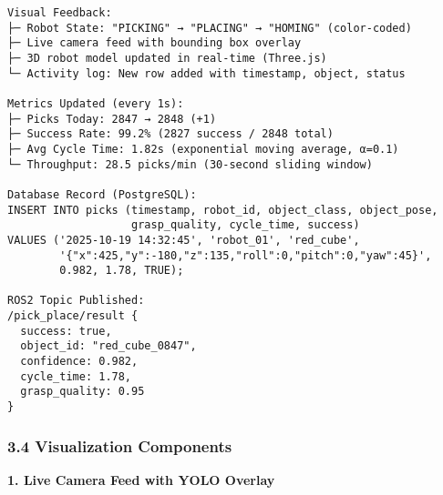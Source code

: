 \documentclass[
]{article}
\begin{document}
\begin{verbatim}
Visual Feedback:
├─ Robot State: "PICKING" → "PLACING" → "HOMING" (color-coded)
├─ Live camera feed with bounding box overlay
├─ 3D robot model updated in real-time (Three.js)
└─ Activity log: New row added with timestamp, object, status

Metrics Updated (every 1s):
├─ Picks Today: 2847 → 2848 (+1)
├─ Success Rate: 99.2% (2827 success / 2848 total)
├─ Avg Cycle Time: 1.82s (exponential moving average, α=0.1)
└─ Throughput: 28.5 picks/min (30-second sliding window)

Database Record (PostgreSQL):
INSERT INTO picks (timestamp, robot_id, object_class, object_pose,
                   grasp_quality, cycle_time, success)
VALUES ('2025-10-19 14:32:45', 'robot_01', 'red_cube',
        '{"x":425,"y":-180,"z":135,"roll":0,"pitch":0,"yaw":45}',
        0.982, 1.78, TRUE);

ROS2 Topic Published:
/pick_place/result {
  success: true,
  object_id: "red_cube_0847",
  confidence: 0.982,
  cycle_time: 1.78,
  grasp_quality: 0.95
}
\end{verbatim}

\hypertarget{visualization-components}{%
\subsubsection{3.4 Visualization
Components}\label{visualization-components}}

\textbf{1. Live Camera Feed with YOLO Overlay}
\end{document}
